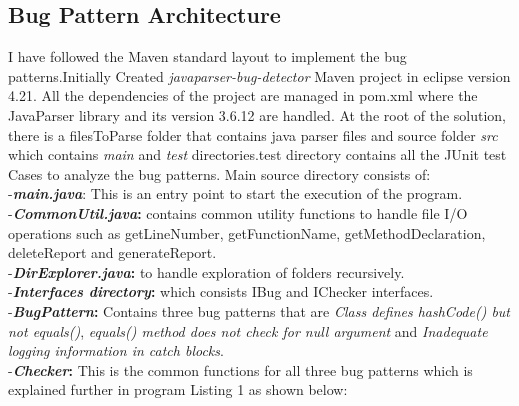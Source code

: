\documentclass[sigplan,screen]{acmart}
\begin{document}
\subsection{Bug Pattern Architecture}
I have followed the Maven standard layout \cite{smart2005introduction} to implement the bug patterns.Initially Created \emph{javaparser-bug-detector} Maven project in eclipse version 4.21. All the dependencies of the project are managed in pom.xml where the JavaParser library and its version 3.6.12 are handled. At the root of the solution, there is a filesToParse folder that contains java parser files and source folder \emph{src} which contains \emph{main} and \emph{test} directories.test directory contains all the JUnit test Cases to analyze the bug patterns. Main source directory consists of:\\
-\textbf{\emph{main.java}}: This is an entry point to start the execution of the program.\\
-\textbf{\emph{CommonUtil.java}:} contains common utility functions to handle file I/O operations such as  getLineNumber, getFunctionName, getMethodDeclaration, deleteReport and generateReport.\\
-\textbf{\emph{DirExplorer.java}:} to handle exploration of folders recursively.\\
-\textbf{\emph{Interfaces directory}:} which consists IBug and IChecker interfaces.\\
-\textbf{\emph{BugPattern}:} Contains three bug patterns that are \emph{Class defines hashCode() but not equals()}, \emph{equals() method does not check for null argument} and \emph{Inadequate logging information in catch blocks}.\\
-\textbf{\emph{Checker}:} This is the common functions for all three bug patterns which is explained further in program Listing 1 as shown below:\\
\end{document}
